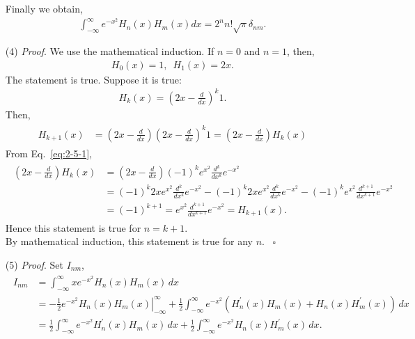 \documentclass[floatfix,nofootinbib,superscriptaddress,fleqn]{revtex4-2}
\begin{document}
\begin{itemize}
Finally we obtain,
\begin{align}\label{eq:2-7}
  \int_{-\infty}^\infty e^{-x^2} H_n(x) H_m(x) dx = 2^nn! \sqrt{\pi}
   \delta_{nm}.
\end{align}
\item[(4)] {\it Proof}. We use the mathematical induction. 
If $n=0$ and $n=1$, then,
\begin{align*}
  H_0(x) = 1,\,\,\,H_1(x)=2x. 
\end{align*}
The statement is true. Suppose it is true:
\begin{align*}
  H_k(x) = \left(2x-\frac{d}{dx}\right)^k 1.
\end{align*}
Then,
\begin{align*}
  \begin{split}
    H_{k+1}(x) &= \left(2x-\frac{d}{dx}\right)
    \left(2x-\frac{d}{dx}\right)^k 1
    =\left(2x-\frac{d}{dx}\right)H_k(x)
  \end{split}
\end{align*}
From Eq.~\eqref{eq:2-5-1},
\begin{align*}
  \begin{split}
    \left(2x-\frac{d}{dx}\right)H_k(x)
    &=\left(2x-\frac{d}{dx}\right)(-1)^ke^{x^2}
    \frac{d^k}{dx^k}e^{-x^2}  \\
    &=(-1)^k 2x e^{x^2}\frac{d^k}{dx^k}e^{-x^2}
    -(-1)^k 2x e^{x^2}\frac{d^k}{dx^k}e^{-x^2}
    -(-1)^k e^{x^2}\frac{d^{k+1}}{dx^{k+1}}e^{-x^2}  \\
    &=(-1)^{k+1}= e^{x^2}\frac{d^{k+1}}{dx^{k+1}}e^{-x^2}
    =H_{k+1}(x).
  \end{split}
\end{align*}
Hence this statement is true for $n=k+1$. \\
By mathematical induction, 
this statement is true for any $n$. ~\hfill $\square$
\item[(5)] {\it Proof}. Set $I_{nm}$,
\begin{align*}
  \begin{split}
    I_{nm} &= \int_{-\infty}^\infty xe^{-x^2}H_n(x)H_m(x) \,dx  \\
    &=-\left.\frac{1}{2}e^{-x^2}H_n(x)H_m(x)\right|
    _{-\infty}^\infty
    +\frac{1}{2}\int_{-\infty}^\infty 
    e^{-x^2}\left(H^\prime_n(x)H_m(x)+H_n(x)
    H^\prime_m(x)\right) \,dx \\
    &=\frac{1}{2}\int_{-\infty}^\infty 
    e^{-x^2}H^\prime_n(x)H_m(x) \,dx+
    \frac{1}{2}\int_{-\infty}^\infty 
    e^{-x^2}H_n(x)H^\prime_m(x) \,dx.
  \end{split}

\end{align*}
\end{itemize}
\end{document}
